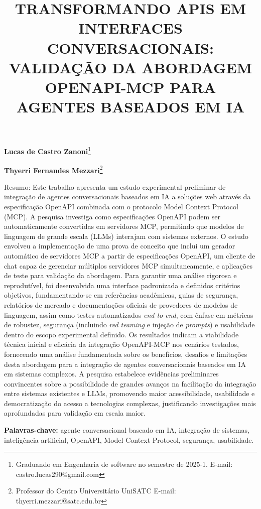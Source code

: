 \documentclass[
]{article}
\title{\textbf{TRANSFORMANDO APIS EM INTERFACES CONVERSACIONAIS:
VALIDAÇÃO DA ABORDAGEM OPENAPI-MCP PARA AGENTES BASEADOS EM IA}}
\author{}
\date{}
\begin{document}
\maketitle

\textbf{Lucas de Castro Zanoni}\footnote{Graduando em Engenharia de
  software no semestre de 2025-1. E-mail: castro.lucas290@gmail.com}

\textbf{Thyerri Fernandes Mezzari}\footnote{Professor do Centro
  Universitário UniSATC E-mail: thyerri.mezzari@satc.edu.br}

Resumo: Este trabalho apresenta um estudo experimental preliminar de
integração de agentes conversacionais baseados em IA a soluções web
através da especificação OpenAPI combinada com o protocolo Model Context
Protocol (MCP). A pesquisa investiga como especificações OpenAPI podem
ser automaticamente convertidas em servidores MCP, permitindo que
modelos de linguagem de grande escala (LLMs) interajam com sistemas
externos. O estudo envolveu a implementação de uma prova de conceito que
inclui um gerador automático de servidores MCP a partir de
especificações OpenAPI, um cliente de chat capaz de gerenciar múltiplos
servidores MCP simultaneamente, e aplicações de teste para validação da
abordagem. Para garantir uma análise rigorosa e reprodutível, foi
desenvolvida uma interface padronizada e definidos critérios objetivos,
fundamentando-se em referências acadêmicas, guias de segurança,
relatórios de mercado e documentações oficiais de provedores de modelos
de linguagem, assim como testes automatizados \emph{end-to-end}, com
ênfase em métricas de robustez, segurança (incluindo \emph{red teaming}
e injeção de \emph{prompts}) e usabilidade dentro do escopo experimental
definido. Os resultados indicam a viabilidade técnica inicial e eficácia
da integração OpenAPI-MCP nos cenários testados, fornecendo uma análise
fundamentada sobre os benefícios, desafios e limitações desta abordagem
para a integração de agentes conversacionais baseados em IA em sistemas
complexos. A pesquisa estabelece evidências preliminares convincentes
sobre a possibilidade de grandes avanços na facilitação da integração
entre sistemas existentes e LLMs, promovendo maior acessibilidade,
usabilidade e democratização do acesso a tecnologias complexas,
justificando investigações mais aprofundadas para validação em escala
maior.

\textbf{Palavras-chave:} agente conversacional baseado em IA, integração
de sistemas, inteligência artificial, OpenAPI, Model Context Protocol,
segurança, usabilidade.
\end{document}
